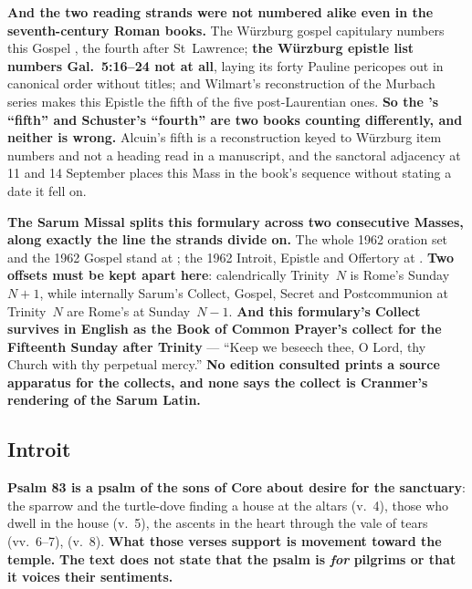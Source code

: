 \textbf{And the two reading strands were not numbered alike even in the
seventh-century Roman books.} The Würzburg gospel capitulary numbers this Gospel
, the fourth after St~Lawrence; \textbf{the
Würzburg epistle list numbers Gal.\ 5:16--24 not at all}, laying its forty
Pauline pericopes out in canonical order without titles; and Wilmart's
reconstruction of the Murbach series makes this Epistle the fifth of the five
post-Laurentian ones. \textbf{So the 's ``fifth'' and
Schuster's ``fourth'' are two books counting differently, and neither is wrong.}
Alcuin's fifth is a reconstruction keyed to Würzburg item numbers and not a
heading read in a manuscript, and the sanctoral adjacency at 11 and 14 September
places this Mass in the book's sequence without stating a date it fell on.

\textbf{The Sarum Missal splits this formulary across two consecutive Masses,
along exactly the line the strands divide on.} The whole 1962 oration set and
the 1962 Gospel stand at ; the 1962 Introit,
Epistle and Offertory at . \textbf{Two offsets must be kept
apart here}: calendrically Trinity~$N$ is Rome's Sunday~$N{+}1$, while internally
Sarum's Collect, Gospel, Secret and Postcommunion at Trinity~$N$ are Rome's at
Sunday~$N{-}1$. \textbf{And this formulary's Collect survives in English as the
Book of Common Prayer's collect for the Fifteenth Sunday after Trinity} ---
``Keep we beseech thee, O Lord, thy Church with thy perpetual mercy.''
\textbf{No edition
consulted prints a source apparatus for the collects, and none says the collect
is Cranmer's rendering of the Sarum Latin.}

\elementguard
\subsection*{Introit }


\textbf{Psalm 83 is a psalm of the sons of Core about desire for the
sanctuary}: the sparrow and the turtle-dove finding a house at
the altars (v.~4), those who dwell in the house (v.~5), the ascents in the
heart through the vale of tears (vv.~6--7),  (v.~8). \textbf{What those verses support is movement toward the
temple.} \textbf{The text does not state that the psalm is
\emph{for} pilgrims or that it voices their sentiments.}

